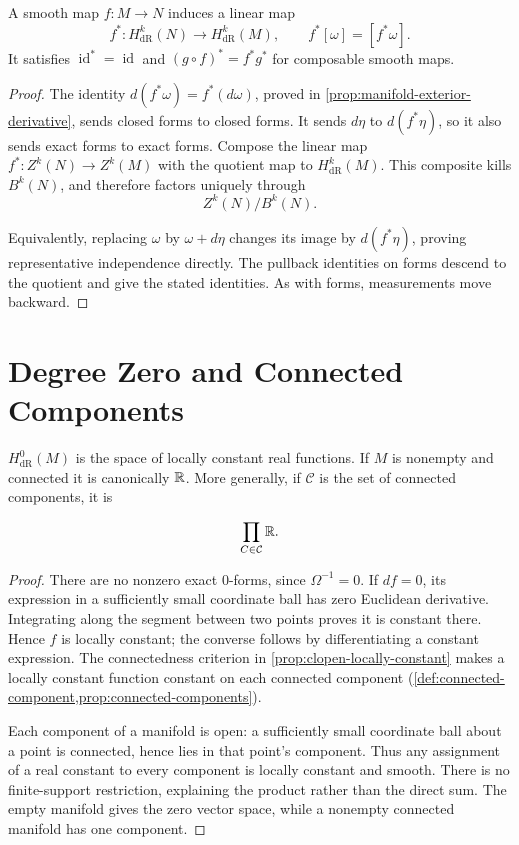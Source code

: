 \begin{proposition}\label{prop:cohomology-pullback}
A smooth map $f:M\to N$ induces a linear map
\[
f^*:H_{\mathrm{dR}}^k(N)\to H_{\mathrm{dR}}^k(M),\qquad
f^*[\omega]=[f^*\omega].
\]
It satisfies $\operatorname{id}^*=\operatorname{id}$ and
$(g\circ f)^*=f^*g^*$ for composable smooth maps.
\end{proposition}
\begin{proof}
The identity $d(f^*\omega)=f^*(d\omega)$, proved in
\cref{prop:manifold-exterior-derivative}, sends closed forms to closed
forms. It sends $d\eta$ to $d(f^*\eta)$, so it also sends exact forms to
exact forms. Compose the linear map $f^*:Z^k(N)\to Z^k(M)$ with the
quotient map to $H_{\mathrm{dR}}^k(M)$. This composite kills $B^k(N)$,
and therefore factors uniquely through
\[
Z^k(N)/B^k(N).
\]

Equivalently, replacing $\omega$ by $\omega+d\eta$ changes its image
by $d(f^*\eta)$, proving representative independence directly.
The pullback identities on forms descend to the quotient and give the
stated identities. As with forms, measurements move backward.
\end{proof}

\section{Degree Zero and Connected Components}
\begin{proposition}\label{prop:cohomology-zero}
$H_{\mathrm{dR}}^0(M)$ is the space of locally constant real functions.
If $M$ is nonempty and connected it is canonically $\mathbb{R}$. More generally,
if $\mathcal C$ is the set of connected components, it is

\[
\prod_{C\in\mathcal C}\mathbb{R}.
\]

\end{proposition}
\begin{proof}
There are no nonzero exact $0$-forms, since $\Omega^{-1}=0$.
If $df=0$, its expression in a sufficiently small coordinate ball has
zero Euclidean derivative. Integrating along the segment between two
points proves it is constant there. Hence $f$ is locally constant;
the converse follows by differentiating a constant expression.
The connectedness criterion in \cref{prop:clopen-locally-constant} makes
a locally constant function constant on each connected component
(\cref{def:connected-component,prop:connected-components}).

Each component of a manifold is open: a sufficiently small coordinate
ball about a point is connected, hence lies in that point's component.
Thus any assignment of a real constant to every component is locally
constant and smooth. There is no finite-support restriction, explaining
the product rather than the direct sum. The empty manifold gives the
zero vector space, while a nonempty connected manifold has one component.
\end{proof}

